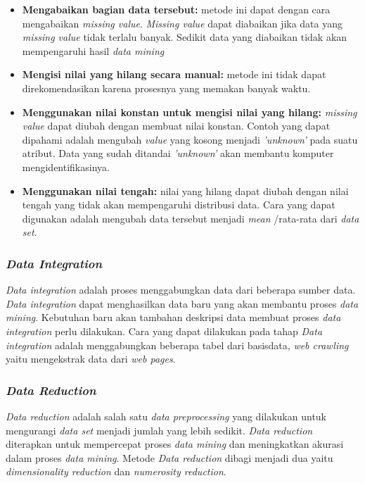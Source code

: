 \documentclass[a4paper,twoside]{article}
\begin{document}
\begin{enumerate}
\begin{itemize}
\item \textbf{Mengabaikan bagian data tersebut:} metode ini dapat dengan cara mengabaikan \textit{missing value}. \textit{Missing value} dapat diabaikan jika data yang \textit{missing value} tidak terlalu banyak. Sedikit data yang diabaikan tidak akan mempengaruhi hasil \textit{data mining}
\item \textbf{Mengisi nilai yang hilang secara manual:} metode ini tidak dapat direkomendasikan karena prosesnya yang memakan banyak waktu.
\item \textbf{Menggunakan nilai konstan untuk mengisi nilai yang hilang:} \textit{missing value} dapat diubah dengan membuat nilai konstan. Contoh yang dapat dipahami adalah mengubah \textit{value} yang kosong menjadi \textit{'unknown'} pada suatu atribut. Data yang sudah ditandai \textit{'unknown'} akan membantu komputer mengidentifikasinya. 
\item \textbf{Menggunakan nilai tengah:} nilai yang hilang dapat diubah dengan nilai tengah yang tidak akan mempengaruhi distribusi data. Cara yang dapat digunakan adalah mengubah data tersebut menjadi \textit{mean} /rata-rata  dari \textit{data set}.
\end{itemize}


\subsubsection{\textit{Data Integration}} 
\textit{Data integration} adalah proses menggabungkan data dari beberapa sumber data. \textit{Data integration} dapat menghasilkan data baru yang akan membantu proses \textit{data mining}. Kebutuhan baru akan tambahan deskripsi data membuat proses \textit{data integration} perlu dilakukan. Cara yang dapat dilakukan pada tahap \textit{Data integration} adalah menggabungkan beberapa tabel dari basisdata, \textit{web crawling} yaitu mengekstrak data dari \textit{web pages}. 



\subsubsection{\textit{Data Reduction}} 
\textit{Data reduction} adalah salah satu \textit{data preprocessing} yang dilakukan untuk mengurangi \textit{data set} menjadi jumlah yang lebih sedikit. \textit{Data reduction} diterapkan untuk mempercepat proses \textit{data mining} dan meningkatkan akurasi dalam proses \textit{data mining}. Metode \textit{Data reduction} dibagi menjadi dua yaitu \textit{dimensionality reduction} dan \textit{numerosity reduction}. 


\end{enumerate}
\end{document}
